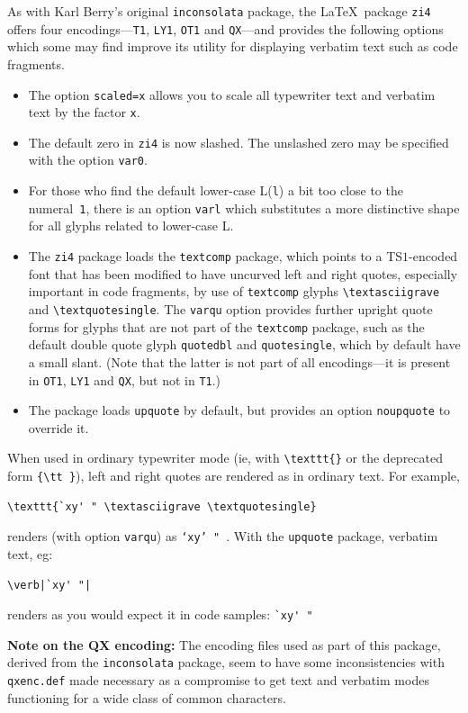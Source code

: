 \documentclass[11pt]{article}
\begin{document}
{As with Karl Berry's original \texttt{inconsolata} package, the \LaTeX\ package \texttt{zi4} offers four encodings---\texttt{T1}, \texttt{LY1}, \texttt{OT1} and \texttt{QX}---and provides the following options which some may find improve its utility for displaying verbatim text such as code fragments. 
\begin{itemize}
\item The option \texttt{scaled=x} allows you to scale all typewriter text and verbatim text by the factor \texttt{x}.
\item
The default zero in \texttt{zi4} is now slashed. The unslashed zero may be specified with the option \texttt{var0}.
\item For those who find the default lower-case L(\texttt{l}) a bit too close to the numeral~\texttt{1}, there is an option \texttt{varl} which substitutes a more distinctive shape for all glyphs related to lower-case L.
\item The \texttt{zi4} package loads the \texttt{textcomp} package, which points to a TS$1$-encoded font that has been modified to have uncurved left and right quotes, especially important in code fragments, by use of \texttt{textcomp} glyphs \verb|\textasciigrave| and \verb|\textquotesingle|. The \texttt{varqu} option provides further upright quote forms for glyphs that are not part of the \texttt{textcomp} package, such as 
the default double quote glyph \texttt{quotedbl} and \texttt{quotesingle}, which by default have a small slant. (Note that the latter is not part of all encodings---it is present in \texttt{OT1}, \texttt{LY1} and \texttt{QX}, but not in \texttt{T1}.)
\item The package loads \texttt{upquote} by default, but provides an option \texttt{noupquote} to override it.
\end{itemize}
When used in ordinary typewriter mode (ie, with \verb|\texttt{}| or the deprecated form \verb|{\tt }|), left and right quotes are rendered as in ordinary text. For example, 
\begin{verbatim}
\texttt{`xy' " \textasciigrave \textquotesingle}
\end{verbatim}
renders (with option \texttt{varqu}) as \texttt{`xy' " \textasciigrave \textquotesingle}. With the \texttt{upquote} package, verbatim text, eg:
\begin{verbatim}
\verb|`xy' "|
\end{verbatim}
 renders as you would expect it in code samples:
\verb|`xy' "|

\textbf{Note on the QX encoding:} The encoding files used as part of this package, derived from the \texttt{inconsolata} package, seem to have some inconsistencies with \texttt{qxenc.def} made necessary as a compromise to get text and verbatim modes functioning for a wide class of common characters.

}
\end{document}
